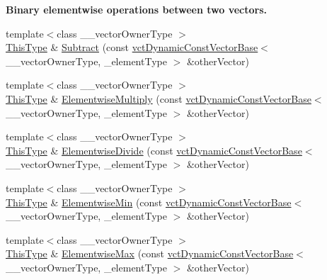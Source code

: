 \begin{Indent}{\bf Binary elementwise operations between two vectors.}
\begin{DoxyCompactItemize}
\item 
{\footnotesize template$<$class \-\_\-\-\_\-vector\-Owner\-Type $>$ }\\\hyperlink{classvct_dynamic_const_vector_base_a39da273523717f678f54d3321ebca3dd}{This\-Type} \& \hyperlink{classvct_dynamic_vector_base_a824ce9d2c9706552ca6116750eeec386}{Subtract} (const \hyperlink{classvct_dynamic_const_vector_base}{vct\-Dynamic\-Const\-Vector\-Base}$<$ \-\_\-\-\_\-vector\-Owner\-Type, \-\_\-element\-Type $>$ \&other\-Vector)
\item 
{\footnotesize template$<$class \-\_\-\-\_\-vector\-Owner\-Type $>$ }\\\hyperlink{classvct_dynamic_const_vector_base_a39da273523717f678f54d3321ebca3dd}{This\-Type} \& \hyperlink{classvct_dynamic_vector_base_aa1dd17f2ca5aa677ae54f469de2e3c5c}{Elementwise\-Multiply} (const \hyperlink{classvct_dynamic_const_vector_base}{vct\-Dynamic\-Const\-Vector\-Base}$<$ \-\_\-\-\_\-vector\-Owner\-Type, \-\_\-element\-Type $>$ \&other\-Vector)
\item 
{\footnotesize template$<$class \-\_\-\-\_\-vector\-Owner\-Type $>$ }\\\hyperlink{classvct_dynamic_const_vector_base_a39da273523717f678f54d3321ebca3dd}{This\-Type} \& \hyperlink{classvct_dynamic_vector_base_a20bfdee5188de2db037dd17a006c5db8}{Elementwise\-Divide} (const \hyperlink{classvct_dynamic_const_vector_base}{vct\-Dynamic\-Const\-Vector\-Base}$<$ \-\_\-\-\_\-vector\-Owner\-Type, \-\_\-element\-Type $>$ \&other\-Vector)
\item 
{\footnotesize template$<$class \-\_\-\-\_\-vector\-Owner\-Type $>$ }\\\hyperlink{classvct_dynamic_const_vector_base_a39da273523717f678f54d3321ebca3dd}{This\-Type} \& \hyperlink{classvct_dynamic_vector_base_afa0399fb7fb0ac76bef4c6550696cbdd}{Elementwise\-Min} (const \hyperlink{classvct_dynamic_const_vector_base}{vct\-Dynamic\-Const\-Vector\-Base}$<$ \-\_\-\-\_\-vector\-Owner\-Type, \-\_\-element\-Type $>$ \&other\-Vector)
\item 
{\footnotesize template$<$class \-\_\-\-\_\-vector\-Owner\-Type $>$ }\\\hyperlink{classvct_dynamic_const_vector_base_a39da273523717f678f54d3321ebca3dd}{This\-Type} \& \hyperlink{classvct_dynamic_vector_base_a9d782455c955138903ef49a02b173aad}{Elementwise\-Max} (const \hyperlink{classvct_dynamic_const_vector_base}{vct\-Dynamic\-Const\-Vector\-Base}$<$ \-\_\-\-\_\-vector\-Owner\-Type, \-\_\-element\-Type $>$ \&other\-Vector)
\item 

\end{DoxyCompactItemize}
\end{Indent}

